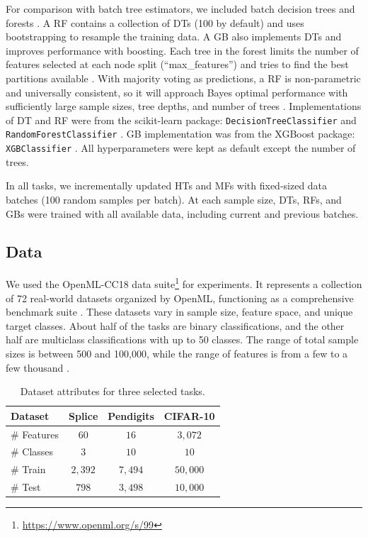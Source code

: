 For comparison with batch tree estimators, we included batch decision trees and forests \citep{breiman_random_2001, friedman_greedy_2001}. A RF contains a collection of DTs (100 by default) and uses bootstrapping to resample the training data. A GB also implements DTs and improves performance with boosting. Each tree in the forest limits the number of features selected at each node split (``max\_features'') and tries to find the best partitions available \citep{breiman_random_2001}.
With majority voting as predictions, a RF is non-parametric and universally consistent, so it will approach Bayes optimal performance with sufficiently large sample sizes, tree depths, and number of trees \citep{liaw_classification_2002, biau_consistency_2008}.
Implementations of DT and RF were from the scikit-learn package: \texttt{DecisionTreeClassifier} and \texttt{RandomForestClassifier} \citep{pedregosa_scikit-learn_2011}. GB implementation was from the XGBoost package: \texttt{XGBClassifier} \citep{chen_xgboost_2016}. All hyperparameters were kept as default except the number of trees.

In all tasks, we incrementally updated HTs and MFs with fixed-sized data batches (100 random samples per batch). At each sample size, DTs, RFs, and GBs were trained with all available data, including current and previous batches. 

\subsection{Data}
We used the OpenML-CC18 data suite\footnote{\url{https://www.openml.org/s/99}} for experiments. It represents a collection of 72 real-world datasets organized by OpenML, functioning as a comprehensive benchmark suite \citep{vanschoren_openml_2013, bischl_openml_2019}. These datasets vary in sample size, feature space, and unique target classes.
About half of the tasks are binary classifications, and the other half are multiclass classifications with up to 50 classes. The range of total sample sizes is between 500 and 100,000, while the range of features is from a few to a few thousand \citep{bischl_openml_2019}.

\begin{table}
\centering
\begin{tabular}{lccc} 
\hline
Dataset & \textbf{Splice} & \textbf{Pendigits} & \textbf{CIFAR-10} \\
\hline
\# Features & $60$ & $16$ & $3,072$ \\
\hline
\# Classes & $3$ & $10$ & $10$ \\
\hline
\# Train & $2,392$ & $7,494$ & $50,000$ \\
\hline
\# Test & $798$ & $3,498$ & $10,000$ \\
\hline
\end{tabular}
\caption{Dataset attributes for three selected tasks.}
\label{table:data}
\end{table}


